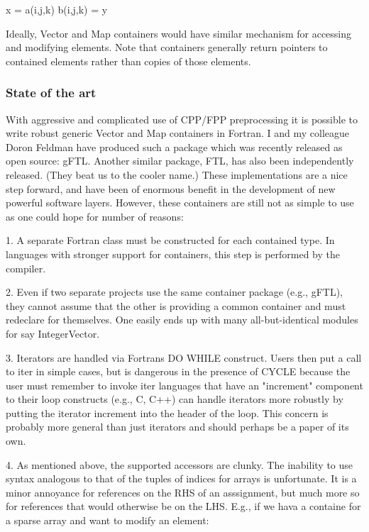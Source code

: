 \documentclass{article}
\begin{document}
      x = a(i,j,k)
      b(i,j,k) = y


Ideally, Vector and Map containers would have similar mechanism for
accessing and modifying elements.  Note that containers generally
return pointers to contained elements rather than copies of those
elements.


\subsubsection{State of the art}

With aggressive and complicated use of CPP/FPP preprocessing it is
possible to write robust generic Vector and Map containers in Fortran.
I and my colleague Doron Feldman have produced such a package which
was recently released as open source: gFTL.  Another similar package,
FTL, has also been independently released.  (They beat us to the
cooler name.)  These implementations are a nice step forward, and have
been of enormous benefit in the development of new powerful software
layers.  However, these containers are still not as simple to use as
one could hope for number of reasons:

1. A separate Fortran class must be constructed for each contained
   type.  In languages with stronger support for containers, this step
   is performed by the compiler.

2. Even if two separate projects use the same container package (e.g.,
   gFTL), they cannot assume that the other is providing a common
   container and must redeclare for themselves.  One easily ends up
   with many all-but-identical modules for say IntegerVector.

3. Iterators are handled via Fortrans DO WHILE construct.  Users then
   put a call to iter%
   in simple cases, but is dangerous in the presence of CYCLE because
   the user must remember to invoke iter%
   languages that have an "increment" component to their loop
   constructs (e.g., C, C++) can handle iterators more robustly by
   putting the iterator increment into the header of the loop.  This
   concern is probably more general than just iterators and should
   perhaps be a paper of its own.

4. As mentioned above, the supported accessors are clunky.  The
   inability to use syntax analogous to that of the tuples of indices
   for arrays is unfortunate.  It is a minor annoyance for references
   on the RHS of an asssignment, but much more so for references that
   would otherwise be on the LHS.  E.g., if we hava a containe for a
   sparse array and want to modify an element:
\end{document}
